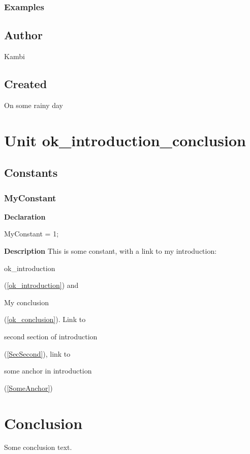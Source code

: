 \documentclass{report}
\begin{document}
\subsection*{Examples}
\section{Author}
\par
Kambi

\section{Created}
\par
On some rainy day


\chapter{Unit ok{\_}introduction{\_}conclusion}
\section{Constants}
\subsection*{MyConstant}
\begin{list}{}{
\setlength{\itemindent}{0cm}
\setlength{\listparindent}{0cm}
\setlength{\leftmargin}{\evensidemargin}
\addtolength{\leftmargin}{\tmplength}
\settowidth{\labelsep}{X}
\addtolength{\leftmargin}{\labelsep}
\setlength{\labelwidth}{\tmplength}
}
\begin{flushleft}
\item[\textbf{Declaration}\hfill]
\begin{ttfamily}
MyConstant = 1;\end{ttfamily}


\end{flushleft}
\par
\item[\textbf{Description}]
This is some constant, with a link to my introduction: \begin{ttfamily}ok{\_}introduction\end{ttfamily}(\ref{ok_introduction}) and \begin{ttfamily}My conclusion\end{ttfamily}(\ref{ok_conclusion}). Link to \begin{ttfamily}second section of introduction\end{ttfamily}(\ref{SecSecond}), link to \begin{ttfamily}some anchor in introduction\end{ttfamily}(\ref{SomeAnchor})

\end{list}
\chapter{Conclusion}
Some conclusion text.
\end{document}
